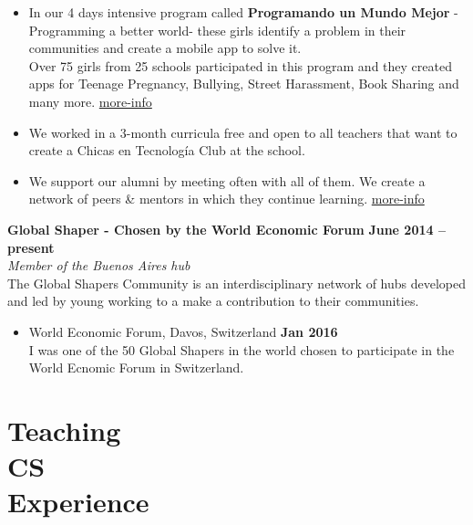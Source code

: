\documentclass[margin,line]{resume}
\begin{document}
\begin{resume}
\begin{itemize}

\item In our 4 days intensive program called \textbf{Programando un Mundo Mejor} -Programming a better world-  these girls identify a problem in their communities and create a mobile app to solve it.
\\
Over 75 girls from 25 schools participated in this program and they created apps for Teenage Pregnancy, Bullying, Street Harassment, Book Sharing and many more. \href{http://www.chicasentecnologia.org/programando-un-mundo-mejor}{more-info} 

\item We worked in a 3-month curricula free and open to all teachers that want to create a Chicas en Tecnología Club at the school.

\item We support our alumni by meeting often with all of them. We create a network of peers \& mentors in which they continue learning. \href{http://www.chicasentecnologia.org/comunidad}{more-info} 
\end{itemize}

\vspace{-5mm}

\textbf{Global Shaper - Chosen by the World Economic Forum} \hfill \textbf{June 2014 -- present} \vspace{2mm}\\\vspace{1mm}
\textsl{Member of the Buenos Aires hub} \\
The Global Shapers Community is an interdisciplinary network of hubs developed and led by young working to a make a contribution to their communities.

\begin{itemize}
\item  World Economic Forum, Davos, Switzerland \hfill \textbf{Jan 2016} \vspace{2mm} \\
I was one of the 50 Global Shapers in the world chosen to participate in the World Ecnomic Forum in Switzerland.

\end{itemize}



\section{\mysidestyle Teaching\\CS\\Experience}


\end{resume}
\end{document}
